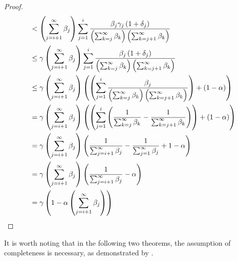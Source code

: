 \begin{lem}
\begin{proof}
\begin{equation}
\begin{split}
                & < \left( \sum_{j=i+1}^{\infty} \beta_j\right) \sum_{j=1}^i \frac{\beta_j \gamma_j\left( 1+\delta_j\right)}{\left( \sum_{k=j}^\infty \beta_k\right)\left(  \sum_{k=j+1}^\infty \beta_k\right)}\\
                & \leq \gamma \left( \sum_{j=i+1}^{\infty} \beta_j\right) \sum_{j=1}^i \frac{\beta_j \left( 1+\delta_j\right)}{\left( \sum_{k=j}^\infty \beta_k\right)\left(  \sum_{k=j+1}^\infty \beta_k\right)}\\
                &\leq \gamma \left(  \sum_{j=i+1}^\infty \beta_j\right)\left(  \left(  \sum_{j=1}^i \frac{\beta_j}{\left( \sum_{k=j}^\infty \beta_k\right)\left(  \sum_{k=j+1}^\infty \beta_k\right)}\right)+ \left( 1-\alpha\right)\right)\\
                & = \gamma \left(  \sum_{j=i+1}^\infty \beta_j\right)\left(  \left(  \sum_{j=1}^i\left( \frac{1}{\sum_{k=j}^\infty \beta_k}-\frac{1}{\sum_{k=j+1}^\infty \beta_k}\right)\right)+ \left( 1-\alpha\right)\right)\\
                & = \gamma\left( \sum_{j=i+1}^\infty \beta_j\right) \left(  \frac{1}{\sum_{j=i+1}^\infty \beta_j} - \frac{1}{\sum_{j=1}^{\infty} \beta_j}+1-\alpha\right)\\
                &=\gamma \left(  \sum_{j=i+1}^\infty \beta_j\right) \left(  \frac{1}{\sum_{j=i+1}^\infty \beta_j}- \alpha\right)\\
                & = \gamma \left(  1- \alpha \left( \sum_{j=i+1}^\infty \beta_j\right)\right)
            \end{split} 
        \end{equation}
    \end{proof} 
\end{lem}
It is worth noting that in the following two theorems, the assumption of completeness is necessary, as demonstrated by \cite{james71}.
